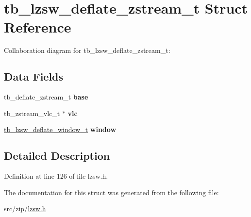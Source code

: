 \hypertarget{structtb__lzsw__deflate__zstream__t}{\section{tb\-\_\-lzsw\-\_\-deflate\-\_\-zstream\-\_\-t Struct Reference}
\label{d2/dda/structtb__lzsw__deflate__zstream__t}
}


Collaboration diagram for tb\-\_\-lzsw\-\_\-deflate\-\_\-zstream\-\_\-t\-:
\subsection*{Data Fields}
\begin{DoxyCompactItemize}
\item 
\hypertarget{structtb__lzsw__deflate__zstream__t_a18a83789bb926b5679c16bf6f8ce7710}{tb\-\_\-deflate\-\_\-zstream\-\_\-t {\bfseries base}}\label{d2/dda/structtb__lzsw__deflate__zstream__t_a18a83789bb926b5679c16bf6f8ce7710}

\item 
\hypertarget{structtb__lzsw__deflate__zstream__t_a0c5c2562d356237bf2f90b47f5e3aa2f}{tb\-\_\-zstream\-\_\-vlc\-\_\-t $\ast$ {\bfseries vlc}}\label{d2/dda/structtb__lzsw__deflate__zstream__t_a0c5c2562d356237bf2f90b47f5e3aa2f}

\item 
\hypertarget{structtb__lzsw__deflate__zstream__t_ad1e3415f07aaac32929e30e7e7299b32}{\hyperlink{structtb__lzsw__deflate__window__t}{tb\-\_\-lzsw\-\_\-deflate\-\_\-window\-\_\-t} {\bfseries window}}\label{d2/dda/structtb__lzsw__deflate__zstream__t_ad1e3415f07aaac32929e30e7e7299b32}

\end{DoxyCompactItemize}


\subsection{Detailed Description}


Definition at line 126 of file lzsw.\-h.



The documentation for this struct was generated from the following file\-:\begin{DoxyCompactItemize}
\item 
src/zip/\hyperlink{lzsw_8h}{lzsw.\-h}\end{DoxyCompactItemize}
